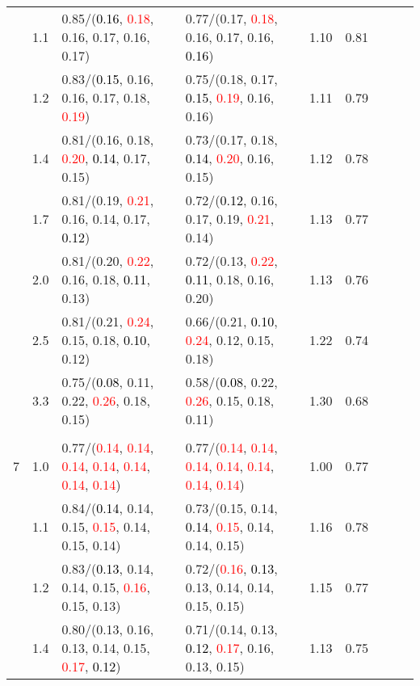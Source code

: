 \documentclass[10pt,a4paper]{report}
\begin{document}
\begin{table}[!htbp]
\begin{center}
{\begin{tabular}{ccllccccc}
			&1.1&0.85/(\textcolor{black}{0.16}, \textcolor{red}{0.18}, 0.16, 0.17, 0.16, 0.17)&0.77/(0.17, \textcolor{red}{0.18}, 0.16, 0.17, 0.16, \textcolor{black}{0.16})&1.10&0.81\\
			&1.2&0.83/(\textcolor{black}{0.15}, 0.16, 0.16, 0.17, 0.18, \textcolor{red}{0.19})&0.75/(0.18, 0.17, \textcolor{black}{0.15}, \textcolor{red}{0.19}, 0.16, 0.16)&1.11&0.79\\
			&1.4&0.81/(0.16, 0.18, \textcolor{red}{0.20}, \textcolor{black}{0.14}, 0.17, 0.15)&0.73/(0.17, 0.18, \textcolor{black}{0.14}, \textcolor{red}{0.20}, 0.16, 0.15)&1.12&0.78\\
			&1.7&0.81/(0.19, \textcolor{red}{0.21}, 0.16, 0.14, 0.17, \textcolor{black}{0.12})&0.72/(\textcolor{black}{0.12}, 0.16, 0.17, 0.19, \textcolor{red}{0.21}, 0.14)&1.13&0.77\\
			&2.0&0.81/(0.20, \textcolor{red}{0.22}, 0.16, 0.18, \textcolor{black}{0.11}, 0.13)&0.72/(0.13, \textcolor{red}{0.22}, \textcolor{black}{0.11}, 0.18, 0.16, 0.20)&1.13&0.76\\
			&2.5&0.81/(0.21, \textcolor{red}{0.24}, 0.15, 0.18, \textcolor{black}{0.10}, 0.12)&0.66/(0.21, \textcolor{black}{0.10}, \textcolor{red}{0.24}, 0.12, 0.15, 0.18)&1.22&0.74\\
			&3.3&0.75/(\textcolor{black}{0.08}, 0.11, 0.22, \textcolor{red}{0.26}, 0.18, 0.15)&0.58/(\textcolor{black}{0.08}, 0.22, \textcolor{red}{0.26}, 0.15, 0.18, 0.11)&1.30&0.68\\
			&&&&\\
			7			&1.0&0.77/(\textcolor{red}{0.14}, \textcolor{red}{0.14}, \textcolor{red}{0.14}, \textcolor{red}{0.14}, \textcolor{red}{0.14}, \textcolor{red}{0.14}, \textcolor{red}{0.14})&0.77/(\textcolor{red}{0.14}, \textcolor{red}{0.14}, \textcolor{red}{0.14}, \textcolor{red}{0.14}, \textcolor{red}{0.14}, \textcolor{red}{0.14}, \textcolor{red}{0.14})&1.00&0.77\\
			&1.1&0.84/(\textcolor{black}{0.14}, 0.14, 0.15, \textcolor{red}{0.15}, 0.14, 0.15, 0.14)&0.73/(0.15, 0.14, \textcolor{black}{0.14}, \textcolor{red}{0.15}, 0.14, 0.14, 0.15)&1.16&0.78\\
			&1.2&0.83/(\textcolor{black}{0.13}, 0.14, 0.14, 0.15, \textcolor{red}{0.16}, 0.15, 0.13)&0.72/(\textcolor{red}{0.16}, \textcolor{black}{0.13}, 0.13, 0.14, 0.14, 0.15, 0.15)&1.15&0.77\\
			&1.4&0.80/(0.13, 0.16, 0.13, 0.14, 0.15, \textcolor{red}{0.17}, \textcolor{black}{0.12})&0.71/(0.14, 0.13, \textcolor{black}{0.12}, \textcolor{red}{0.17}, 0.16, 0.13, 0.15)&1.13&0.75\\

\end{tabular}}
\end{center}
\end{table}
\end{document}
